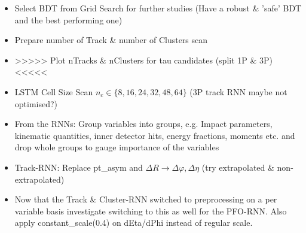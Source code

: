 \begin{itemize}
\item Select BDT from Grid Search for further studies (Have a robust \& 'safe'
  BDT and the best performing one)
\item Prepare number of Track \& number of Clusters scan
\item >>>>> Plot nTracks \& nClusters for tau candidates (split 1P \& 3P) <<<<<
\item LSTM Cell Size Scan $n_c \in \{8, 16, 24, 32, 48, 64\}$ (3P track RNN
  maybe not optimised?)
\item From the RNNs: Group variables into groups, e.g. Impact parameters,
  kinematic quantities, inner detector hits, energy fractions, moments etc. and
  drop whole groups to gauge importance of the variables
\item Track-RNN: Replace pt\_asym and $\Delta R \rightarrow \Delta\varphi,
  \Delta\eta$ (try extrapolated \& non-extrapolated)
\item Now that the Track \& Cluster-RNN switched to preprocessing on a per
  variable basis investigate switching to this as well for the PFO-RNN. Also
  apply constant_scale(0.4) on dEta/dPhi instead of regular scale.
\end{itemize}


